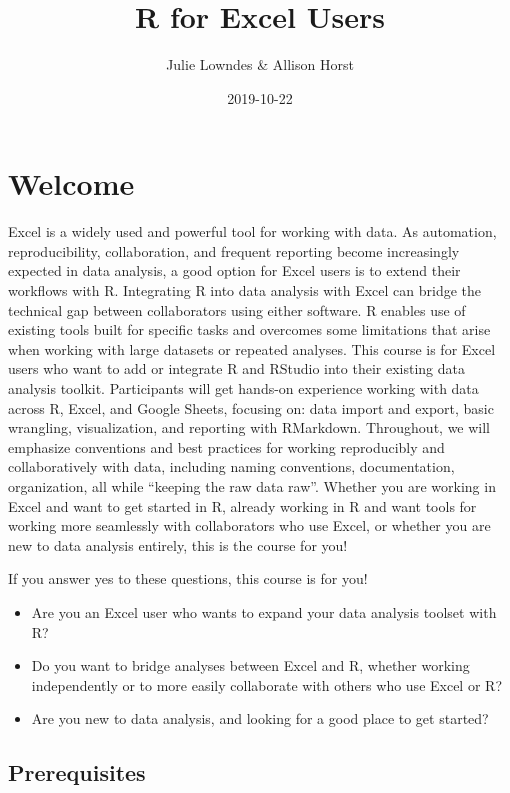 \documentclass[]{book}
\title{R for Excel Users}
\author{Julie Lowndes \& Allison Horst}
\date{2019-10-22}
\providecommand{\tightlist}{%
  \setlength{\itemsep}{0pt}\setlength{\parskip}{0pt}}
\begin{document}
\maketitle

{
\setcounter{tocdepth}{1}
\tableofcontents
}
\hypertarget{welcome}{%
\chapter{Welcome}\label{welcome}}

Excel is a widely used and powerful tool for working with data. As automation, reproducibility, collaboration, and frequent reporting become increasingly expected in data analysis, a good option for Excel users is to extend their workflows with R. Integrating R into data analysis with Excel can bridge the technical gap between collaborators using either software. R enables use of existing tools built for specific tasks and overcomes some limitations that arise when working with large datasets or repeated analyses. This course is for Excel users who want to add or integrate R and RStudio into their existing data analysis toolkit. Participants will get hands-on experience working with data across R, Excel, and Google Sheets, focusing on: data import and export, basic wrangling, visualization, and reporting with RMarkdown. Throughout, we will emphasize conventions and best practices for working reproducibly and collaboratively with data, including naming conventions, documentation, organization, all while ``keeping the raw data raw''. Whether you are working in Excel and want to get started in R, already working in R and want tools for working more seamlessly with collaborators who use Excel, or whether you are new to data analysis entirely, this is the course for you!

If you answer yes to these questions, this course is for you!

\begin{itemize}
\tightlist
\item
  Are you an Excel user who wants to expand your data analysis toolset with R?
\item
  Do you want to bridge analyses between Excel and R, whether working independently or to more easily collaborate with others who use Excel or R?
\item
  Are you new to data analysis, and looking for a good place to get started?
\end{itemize}

\hypertarget{prerequisites}{%
\section{Prerequisites}\label{prerequisites}}
\end{document}
